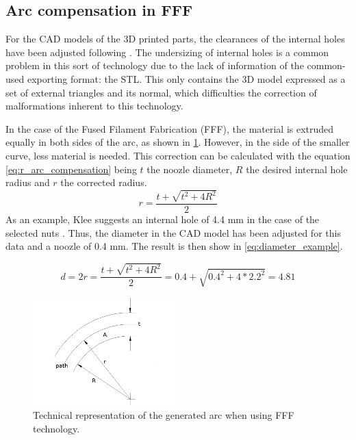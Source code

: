   \subsection{Arc compensation in FFF} %
  \label{sub:arc_compensation}
  For the CAD models of the 3D printed parts, the clearances of the internal holes have been adjusted following \cite{arc_compensation}.
  The undersizing of internal holes is a common problem in this sort of technology due to the lack of information of the common-used exporting format: the STL.
  This only contains the 3D model expressed as a set of external triangles and its normal, which difficulties the correction of malformations inherent to this technology.

  In the case of the Fused Filament Fabrication (FFF), the material is extruded equally in both sides of the arc, as shown in \ref{fig:arc_compensation}. 
  However, in the side of the smaller curve, less material is needed.
  This correction can be calculated with the equation \ref{eq:r_arc_compensation}   being $t$ the noozle diameter, $R$ the desired internal hole radius and $r$ the corrected radius.
  \begin{equation}
    \label{eq:r_arc_compensation}
    r=\frac{t+\sqrt{t^2+4R^2}}{2}
  \end{equation}
  As an example, Klee suggests an internal hole of 4.4 mm in the case of the selected nuts \cite{klee}. 
  Thus, the diameter in the CAD model has been adjusted for this data and a noozle of 0.4 mm. The result is then show in \ref{eq:diameter_example}.

  \begin{equation}
    \label{eq:diameter_example}
    d=2r=\frac{t+\sqrt{t^2+4R^2}}{2}=0.4+\sqrt{0.4^2+4*2.2^2}=4.81
  \end{equation}

  \begin{figure}[tb]
    \centering
    \includegraphics[width=0.5\textwidth]{figures/Arc-compensation}
    \caption{Technical representation of the generated arc when using FFF technology.}
    \label{fig:arc_compensation}
  \end{figure}

